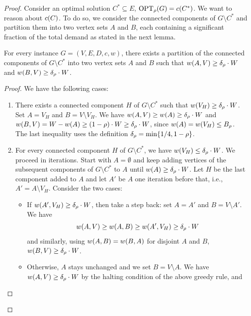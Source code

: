 \begin{proof}
    Consider an optimal solution $C^*\subseteq E$, $\textup{OPT}_{\rho}\mathopen{}\left( G \right)=c\mathopen{}\left( C^* \right)$.
    We want to reason about $c\mathopen{}\left( C \right)$.
    To do so, we consider the connected components of $G\setminus C^*$ and partition them into two vertex sets $A$ and $B$, each containing a significant fraction of the total demand as stated in the next lemma.
    \begin{lemma} \label{lem:ABpartition}
                For every instance $G=(V,E,D,c,w)$, there exists a partition of the connected components of $G\setminus C^*$ into two vertex sets $A$ and $B$ such that $w\mathopen{}\left( A, V \right)\geq \delta_{\rho}\cdot W$ and $w\mathopen{}\left( B, V \right)\geq \delta_{\rho}\cdot W$.
    \end{lemma}
    \begin{proof}
    We have the following cases:
    \begin{enumerate}
                \item There exists a connected component $H$ of $G\setminus C^*$ such that $w\mathopen{}\left( V_H \right)\geq \delta_{\rho}\cdot W$.
                Set $A=V_H$ and $B=V\setminus V_H$. We have
                $w\mathopen{}\left( A, V \right)\geq w\mathopen{}\left( A \right) \geq \delta_{\rho}\cdot W$
                and 
                $w\mathopen{}\left( B, V \right)=W-w\mathopen{}\left( A \right)\geq \mathopen{}\left( 1-\rho \right)\cdot W\geq \delta_{\rho}\cdot W$,
                since $w\mathopen{}\left( A \right)=w\mathopen{}\left( V_H \right)\leq B_\rho$. The last inequality uses the definition $\delta_{\rho}=\min\mathopen{}\left\{ 1/4,1-\rho \right\}$.
        \item For every connected component $H$ of $G\setminus C^*$, we have $w\mathopen{}\left( V_H \right)\leq \delta_{\rho}\cdot W$. We proceed in iterations. Start with $A=\emptyset$ and keep adding vertices of the subsequent components of $G\setminus C^*$ to $A$ until $w\mathopen{}\left( A \right)\geq \delta_{\rho}\cdot W$. Let $H$ be the last component added to $A$ and let $A'$ be $A$ one iteration before that, i.e., $A'=A\setminus V_H$.
        Consider the two cases:
        \begin{itemize}
                        \item If $w\mathopen{}\left( A', V_H \right)\geq \delta_{\rho}\cdot W$, then take a step back: set $A=A'$ and $B=V\setminus A'$. We have
            \[
                        w\mathopen{}\left( A, V \right)\geq w\mathopen{}\left( A, B \right) \geq w\mathopen{}\left( A', V_H \right)\geq \delta_{\rho}\cdot W
            \]
                        and similarly, using $w\mathopen{}\left( A,B \right)=w\mathopen{}\left( B,A \right)$ for disjoint $A$ and $B$, $w\mathopen{}\left( B, V \right)\geq \delta_{\rho}\cdot W$.
            \item Otherwise, $A$ stays unchanged and we set $B=V\setminus A$. We have $w\mathopen{}\left( A, V \right)\geq \delta_{\rho}\cdot W$ by the halting condition of the above greedy rule, and

\end{itemize}
\end{enumerate}
\end{proof}
\end{proof}
